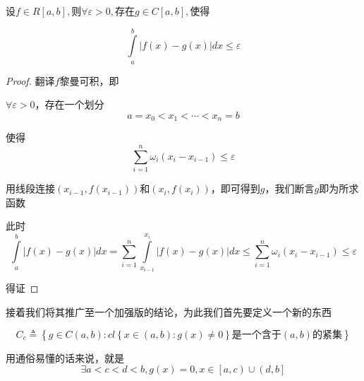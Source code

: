 \documentclass[lang=cn,10pt]{elegantbook}
\begin{document}
	\begin{theorem}[定积分的逼近]
		设$f\in R\left[ a,b \right] ,\text{则}\forall \varepsilon >0,\text{存在}g\in C\left[ a,b \right] ,\text{使得}$
		
		\begin{equation*}
			\int\limits_a^b{|f\left( x \right) -g\left( x \right) |dx}\le \varepsilon
		\end{equation*}
	\end{theorem}
	\begin{proof}
		
		翻译$f$黎曼可积，即
		
		$\forall \varepsilon >0$，存在一个划分
		\begin{equation*}
			a=x_{0}<x_{1}<\cdots<x_{n}=b
		\end{equation*}
		 
		 使得
		 \begin{equation*}
		 	\sum_{i=1}^n{\omega _i\left( x_i-x_{i-1} \right)}\le \varepsilon 
		 \end{equation*}
		 
		 用线段连接$\left( x_{i-1},f\left( x_{i-1} \right) \right) \text{和}\left( x_i,f\left( x_i \right) \right) $，即可得到$g$，我们断言$g$即为所求函数
		 
		 此时
		 \begin{equation*}
		 	\int\limits_a^b{|f\left( x \right) -g\left( x \right) |dx}=\sum_{i=1}^n{\int\limits_{x_{i-1}}^{x_i}{|f\left( x \right) -g\left( x \right) |dx}}\le \sum_{i=1}^n{\omega _i\left( x_i-x_{i-1} \right)}\le \varepsilon 
		 \end{equation*}
		 
		 得证
	\end{proof}
	
	接着我们将其推广至一个加强版的结论，为此我们首先要定义一个新的东西
	
	\begin{equation*}
		C_c\triangleq \left\{ g\in C\left( a,b \right) :cl\left\{ x\in \left( a,b \right) :g\left( x \right) \ne 0 \right\} \text{是一个含于}\left( a,b \right) \text{的紧集} \right\} 
	\end{equation*}
	
	用通俗易懂的话来说，就是
	\begin{equation*}
		\exists a<c<d<b,g\left( x \right) =0,x\in \left[ a,c \right) \cup \left( d,b \right] 
	\end{equation*}
	
\end{document}
